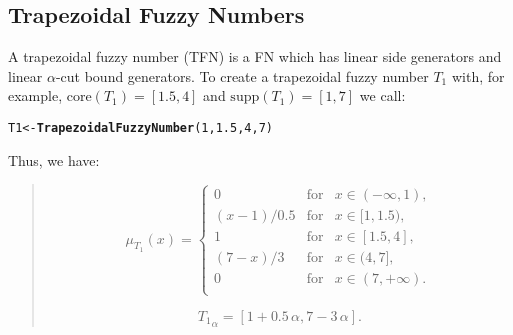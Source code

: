 \documentclass[11pt]{article}\usepackage[]{graphicx}\usepackage[]{color}
\makeatletter
\newcommand{\hlnum}[1]{\textcolor[rgb]{0.686,0.059,0.569}{#1}}%
\newcommand{\hlstd}[1]{\textcolor[rgb]{0.345,0.345,0.345}{#1}}%
\newcommand{\hlkwb}[1]{\textcolor[rgb]{0.69,0.353,0.396}{#1}}%
\newcommand{\hlkwd}[1]{\textcolor[rgb]{0.737,0.353,0.396}{\textbf{#1}}}%
\newenvironment{kframe}{%
 \def\at@end@of@kframe{}%
 \ifinner\ifhmode%
  \def\at@end@of@kframe{\end{minipage}}%
  \begin{minipage}{\columnwidth}%
 \fi\fi%
 \def\FrameCommand##1{\hskip\@totalleftmargin \hskip-\fboxsep
 \colorbox{shadecolor}{##1}\hskip-\fboxsep
     \hskip-\linewidth \hskip-\@totalleftmargin \hskip\columnwidth}%
 \MakeFramed {\advance\hsize-\width
   \@totalleftmargin\z@ \linewidth\hsize
   \@setminipage}}%
 {\par\unskip\endMakeFramed%
 \at@end@of@kframe}
\newenvironment{knitrout}{}{} %
\makeatother
\begin{document}
%
%
%
%
%
%


\subsection{Trapezoidal Fuzzy Numbers}\label{Sec:TFNdef}

A trapezoidal fuzzy number (TFN) is a FN which has linear
side generators and linear $\alpha$-cut bound generators.
To create a trapezoidal fuzzy number $T_1$
with, for example, $\mathrm{core}(T_1)=[1.5,4]$
and $\mathrm{supp}(T_1)=[1,7]$ we call:

\begin{knitrout}\small
{}\color{fgcolor}\begin{kframe}
\begin{alltt}
\hlstd{T1} \hlkwb{<-} \hlkwd{TrapezoidalFuzzyNumber}\hlstd{(}\hlnum{1}\hlstd{,} \hlnum{1.5}\hlstd{,} \hlnum{4}\hlstd{,} \hlnum{7}\hlstd{)}
\end{alltt}
\end{kframe}
\end{knitrout}

\noindent
Thus, we have:
\begin{quote}
\[
\mu_{T_1}(x) = \left\{
\begin{array}{lll}
0      & \text{for} & x\in(-\infty,1), \\
(x-1)/0.5 & \text{for} & x\in[1,1.5), \\
1      & \text{for} & x\in[1.5,4], \\
(7-x)/3 & \text{for} & x\in(4,7], \\
0      & \text{for} & x\in(7,+\infty). \\
\end{array}
\right.
\]

\[
{T_1}_\alpha = [1+0.5\,\alpha, 7-3\,\alpha].
\]
\end{quote}
\end{document}
